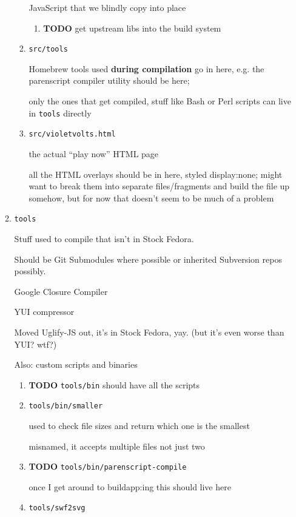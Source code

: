 \documentclass[11pt]{article}
\begin{document}
\begin{enumerate}
\begin{enumerate}
\begin{enumerate}
JavaScript that we blindly copy into place

\begin{enumerate}
\item {\bfseries\sffamily TODO} get upstream libs into the build system
\label{sec-5-4-1-4-4-1}
\end{enumerate}
\item \texttt{src/tools}
\label{sec-5-4-1-4-5}

Homebrew tools used \textbf{during compilation} go in here, e.g. the
parenscript compiler utility should be here;

only the ones that get compiled, stuff like Bash or Perl scripts can
live in \texttt{tools} directly
\item \texttt{src/violetvolts.html}
\label{sec-5-4-1-4-6}

the actual “play now” HTML page

all the HTML overlays should be in here, styled display:none; might
want to break them into separate files/fragments and build the file up
somehow, but for now that doesn't seem to be much of a problem
\end{enumerate}
\item \texttt{tools}
\label{sec-5-4-1-5}

Stuff used to compile that isn't in Stock Fedora. 

Should be Git Submodules where possible or inherited Subversion
repos possibly. 

Google Closure Compiler

YUI compressor

Moved Uglify-JS out, it's in Stock Fedora, yay. (but it's even worse
than YUI? wtf?)

Also: custom scripts and binaries

\begin{enumerate}
\item {\bfseries\sffamily TODO} \texttt{tools/bin} should have all the scripts
\label{sec-5-4-1-5-1}

\item \texttt{tools/bin/smaller}
\label{sec-5-4-1-5-2}

used to check file sizes and return which one is the smallest

misnamed, it accepts multiple files not just two
\item {\bfseries\sffamily TODO} \texttt{tools/bin/parenscript-compile}
\label{sec-5-4-1-5-3}

once I get around to buildapp:ing this should live here
\item \texttt{tools/swf2svg}
\label{sec-5-4-1-5-4}


\end{enumerate}
\end{enumerate}
\end{enumerate}
\end{document}
